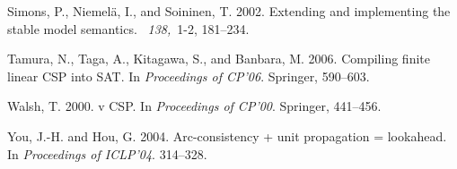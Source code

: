 \documentclass{tlp}
\begin{document}
\begin{thebibliography}{}
{\sc Simons, P.}, {\sc Niemel{\"a}, I.}, {\sc and} {\sc Soininen, T.} 2002.
\newblock Extending and implementing the stable model semantics.
~{\em 138,\/}~1-2, 181--234.

{\sc Tamura, N.}, {\sc Taga, A.}, {\sc Kitagawa, S.}, {\sc and} {\sc Banbara,
  M.} 2006.
\newblock Compiling finite linear {CSP} into {SAT}.
\newblock In {\em Proceedings of CP'06}. Springer, 590--603.

{\sc Walsh, T.} 2000.
 v {CSP}.
\newblock In {\em Proceedings of CP'00}. Springer, 441--456.

{\sc You, J.-H.} {\sc and} {\sc Hou, G.} 2004.
\newblock Arc-consistency + unit propagation = lookahead.
\newblock In {\em Proceedings of ICLP'04}. 314--328.

\end{thebibliography}
\end{document}
